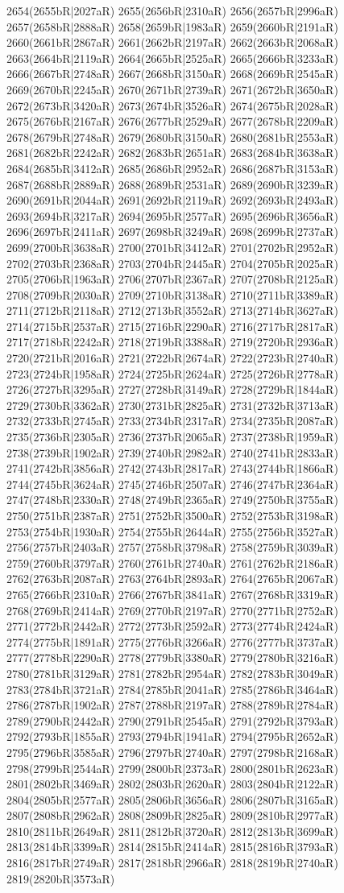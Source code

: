 2654(2655bR|2027aR) 2655(2656bR|2310aR) 2656(2657bR|2996aR) 2657(2658bR|2888aR) 2658(2659bR|1983aR) 2659(2660bR|2191aR) 2660(2661bR|2867aR) 2661(2662bR|2197aR) 2662(2663bR|2068aR) 2663(2664bR|2119aR) 2664(2665bR|2525aR) 2665(2666bR|3233aR) 2666(2667bR|2748aR) 2667(2668bR|3150aR) 2668(2669bR|2545aR) 2669(2670bR|2245aR) 2670(2671bR|2739aR) 2671(2672bR|3650aR) 2672(2673bR|3420aR) 2673(2674bR|3526aR) 2674(2675bR|2028aR) 2675(2676bR|2167aR) 2676(2677bR|2529aR) 2677(2678bR|2209aR) 2678(2679bR|2748aR) 2679(2680bR|3150aR) 2680(2681bR|2553aR) 2681(2682bR|2242aR) 2682(2683bR|2651aR) 2683(2684bR|3638aR) 2684(2685bR|3412aR) 2685(2686bR|2952aR) 2686(2687bR|3153aR) 2687(2688bR|2889aR) 2688(2689bR|2531aR) 2689(2690bR|3239aR) 2690(2691bR|2044aR) 2691(2692bR|2119aR) 2692(2693bR|2493aR) 2693(2694bR|3217aR) 2694(2695bR|2577aR) 2695(2696bR|3656aR) 2696(2697bR|2411aR) 2697(2698bR|3249aR) 2698(2699bR|2737aR) 2699(2700bR|3638aR) 2700(2701bR|3412aR) 2701(2702bR|2952aR) 2702(2703bR|2368aR) 2703(2704bR|2445aR) 2704(2705bR|2025aR) 2705(2706bR|1963aR) 2706(2707bR|2367aR) 2707(2708bR|2125aR) 2708(2709bR|2030aR) 2709(2710bR|3138aR) 2710(2711bR|3389aR) 2711(2712bR|2118aR) 2712(2713bR|3552aR) 2713(2714bR|3627aR) 2714(2715bR|2537aR) 2715(2716bR|2290aR) 2716(2717bR|2817aR) 2717(2718bR|2242aR) 2718(2719bR|3388aR) 2719(2720bR|2936aR) 2720(2721bR|2016aR) 2721(2722bR|2674aR) 2722(2723bR|2740aR) 2723(2724bR|1958aR) 2724(2725bR|2624aR) 2725(2726bR|2778aR) 2726(2727bR|3295aR) 2727(2728bR|3149aR) 2728(2729bR|1844aR) 2729(2730bR|3362aR) 2730(2731bR|2825aR) 2731(2732bR|3713aR) 2732(2733bR|2745aR) 2733(2734bR|2317aR) 2734(2735bR|2087aR) 2735(2736bR|2305aR) 2736(2737bR|2065aR) 2737(2738bR|1959aR) 2738(2739bR|1902aR) 2739(2740bR|2982aR) 2740(2741bR|2833aR) 2741(2742bR|3856aR) 2742(2743bR|2817aR) 2743(2744bR|1866aR) 2744(2745bR|3624aR) 2745(2746bR|2507aR) 2746(2747bR|2364aR) 2747(2748bR|2330aR) 2748(2749bR|2365aR) 2749(2750bR|3755aR) 2750(2751bR|2387aR) 2751(2752bR|3500aR) 2752(2753bR|3198aR) 2753(2754bR|1930aR) 2754(2755bR|2644aR) 2755(2756bR|3527aR) 2756(2757bR|2403aR) 2757(2758bR|3798aR) 2758(2759bR|3039aR) 2759(2760bR|3797aR) 2760(2761bR|2740aR) 2761(2762bR|2186aR) 2762(2763bR|2087aR) 2763(2764bR|2893aR) 2764(2765bR|2067aR) 2765(2766bR|2310aR) 2766(2767bR|3841aR) 2767(2768bR|3319aR) 2768(2769bR|2414aR) 2769(2770bR|2197aR) 2770(2771bR|2752aR) 2771(2772bR|2442aR) 2772(2773bR|2592aR) 2773(2774bR|2424aR) 2774(2775bR|1891aR) 2775(2776bR|3266aR) 2776(2777bR|3737aR) 2777(2778bR|2290aR) 2778(2779bR|3380aR) 2779(2780bR|3216aR) 2780(2781bR|3129aR) 2781(2782bR|2954aR) 2782(2783bR|3049aR) 2783(2784bR|3721aR) 2784(2785bR|2041aR) 2785(2786bR|3464aR) 2786(2787bR|1902aR) 2787(2788bR|2197aR) 2788(2789bR|2784aR) 2789(2790bR|2442aR) 2790(2791bR|2545aR) 2791(2792bR|3793aR) 2792(2793bR|1855aR) 2793(2794bR|1941aR) 2794(2795bR|2652aR) 2795(2796bR|3585aR) 2796(2797bR|2740aR) 2797(2798bR|2168aR) 2798(2799bR|2544aR) 2799(2800bR|2373aR) 2800(2801bR|2623aR) 2801(2802bR|3469aR) 2802(2803bR|2620aR) 2803(2804bR|2122aR) 2804(2805bR|2577aR) 2805(2806bR|3656aR) 2806(2807bR|3165aR) 2807(2808bR|2962aR) 2808(2809bR|2825aR) 2809(2810bR|2977aR) 2810(2811bR|2649aR) 2811(2812bR|3720aR) 2812(2813bR|3699aR) 2813(2814bR|3399aR) 2814(2815bR|2414aR) 2815(2816bR|3793aR) 2816(2817bR|2749aR) 2817(2818bR|2966aR) 2818(2819bR|2740aR) 2819(2820bR|3573aR) 